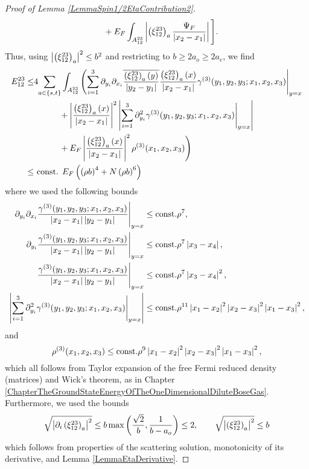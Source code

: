 \begin{proof}[Proof of Lemma \ref{LemmaSpin1/2EtaContribution2}]
\begin{equation}
\begin{aligned}
&\qquad + E_F\int_{A_{12}^{23}} \left\lvert \left(\xi_{12}^{23}\right)_a \frac{\Psi_F}{\left\lvert x_2-x_1 \right\rvert} \right\rvert\Bigg].
\end{aligned}
\end{equation}
 Thus, using $ \left\lvert \left(\xi_{12}^{23}\right)_a \right\rvert^2\leq b^2 $ and restricting to $ b\geq 2a_o\geq2a_e $, we find \begin{equation}
\begin{aligned}
E_{12}^{23}\leq& 4\!\sum_{a\in\{s,t\}} \int_{A_{12}^{23}}\Bigg(\! \sum_{i=1}^{3}\partial_{y_i}\partial_{x_i}\overline{\frac{\left(\xi_{12}^{23}\right)_a(y)}{\left\lvert y_2-y_1 \right\rvert}}\frac{\left(\xi_{12}^{23}\right)_a(x)}{\left\lvert x_2-x_1 \right\rvert}\gamma^{(3)}(y_1,y_2,y_3;x_1,x_2,x_3)\Bigg\rvert_{y=x}\\
&\qquad\quad+\left\lvert \frac{\left(\xi_{12}^{23}\right)_a(x)}{\left\lvert x_2-x_1 \right\rvert} \right\rvert^2\left\lvert \sum_{i=1}^{3}  \partial_{y_i}^2\gamma^{(3)}(y_1,y_2,y_3;x_1,x_2,x_3)\Bigg\rvert_{y=x} \right\rvert\\
&\qquad\quad+E_F\left\lvert \frac{\left(\xi_{12}^{23}\right)_a(x)}{\left\lvert x_2-x_1 \right\rvert} \right\rvert^2\rho^{(3)}(x_1,x_2,x_3)\Bigg)\\
\leq& \text{ const. } E_F\left(\left(\rho b\right)^4+N\left(\rho b\right)^6 \right)
\end{aligned}
\end{equation}
where we used the following bounds \begin{equation}
\begin{aligned}
\partial_{y_i}\partial_{x_i}\frac{\gamma^{(3)}(y_1,y_2,y_3;x_1,x_2,x_3)}{\left\lvert x_2-x_1 \right\rvert\left\lvert y_2-y_1 \right\rvert}\Bigg \lvert_{y=x}&\leq \text{const.} \rho^{7},\\
\partial_{y_i}\frac{\gamma^{(3)}(y_1,y_2,y_3;x_1,x_2,x_3)}{\left\lvert x_2-x_1 \right\rvert\left\lvert y_2-y_1 \right\rvert}\Bigg \lvert_{y=x}&\leq \text{const.} \rho^{7}\left\lvert x_3-x_4 \right\rvert,\\
\frac{\gamma^{(3)}(y_1,y_2,y_3;x_1,x_2,x_3)}{\left\lvert x_2-x_1 \right\rvert\left\lvert y_2-y_1 \right\rvert}\Bigg \lvert_{y=x}&\leq \text{const.} \rho^{7}\left\lvert x_3-x_4 \right\rvert^2,\\
\left\lvert \sum_{i=1}^{3}\partial_{y_i}^2\gamma^{(3)}(y_1,y_2,y_3;x_1,x_2,x_3) \Bigg \lvert_{y=x} \right\rvert&\leq \text{const.} \rho^{11} \left\lvert x_1-x_2 \right\rvert^2\left\lvert x_2-x_3 \right\rvert^2\left\lvert x_1-x_3 \right\rvert^2,
\end{aligned}
\end{equation}
and \begin{equation}
\rho^{(3)}(x_1,x_2,x_3)\leq\text{const.} \rho^9 \left\lvert x_1-x_2 \right\rvert^2\left\lvert x_2-x_3 \right\rvert^2\left\lvert x_1-x_3 \right\rvert^2,
\end{equation}
which all follows from Taylor expansion of the free Fermi reduced density (matrices) and Wick's theorem, as in Chapter \ref{ChapterTheGroundStateEnergyOfTheOneDimensionalDiluteBoseGas}. Furthermore, we used the bounds \begin{equation}
\sqrt{\left\lvert \partial_i\left(\xi_{12}^{23}\right)_a \right\rvert^2}\leq b \max\left(\frac{\sqrt{2}}{b},\frac{1}{b-a_o}\right)\leq 2,\qquad \sqrt{\left\lvert \left(\xi_{12}^{23}\right)_a \right\rvert^2}\leq b
\end{equation}
which follows from properties of the scattering solution, monotonicity of its derivative, and Lemma \ref{LemmaEtaDerivative}.
\end{proof}
